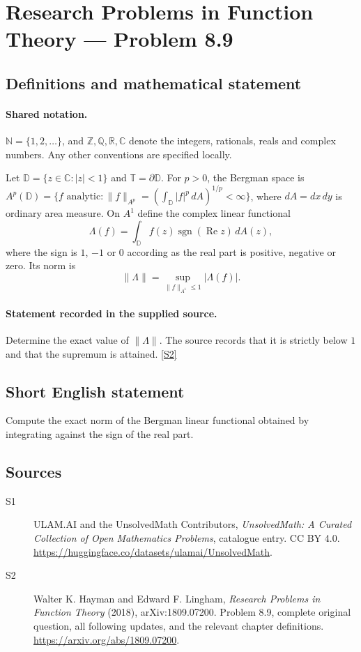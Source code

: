 \documentclass[11pt]{book}
\newcommand{\sref}[2]{\hyperlink{source:#1:#2}{[S#2]}}
\begin{document}
\section{Research Problems in Function Theory — Problem 8.9}\label{statement}

\subsection{Definitions and mathematical statement}

\paragraph{Shared notation.}$\mathbb N=\{1,2,\ldots\}$, and $\mathbb Z,\mathbb Q,\mathbb R,\mathbb C$ denote the integers, rationals, reals and complex numbers. Any other conventions are specified locally.


Let $\mathbb D=\{z\in\mathbb C:|z|<1\}$ and $\mathbb T=\partial\mathbb D$. For $p>0$, the Bergman space is $A^p(\mathbb D)=\{f\text{ analytic}:\|f\|_{A^p}=(\int_{\mathbb D}|f|^p\,dA)^{1/p}<\infty\}$, where $dA=dx\,dy$ is ordinary area measure. On $A^1$ define the complex linear functional \[\Lambda(f)=\int_{\mathbb D}f(z)\operatorname{sgn}(\operatorname{Re}z)\,dA(z),\] where the sign is $1$, $-1$ or $0$ according as the real part is positive, negative or zero. Its norm is \[\|\Lambda\|=\sup_{\|f\|_{A^1}\le1}|\Lambda(f)|.\]
\paragraph{Statement recorded in the supplied source.}
Determine the exact value of $\|\Lambda\|$. The source records that it is strictly below $1$ and that the supremum is attained. \sref{statement}{2}
\subsection{Short English statement}
Compute the exact norm of the Bergman linear functional obtained by integrating against the sign of the real part.
\subsection{Sources}
\begin{description}
\item[\hypertarget{source:statement:1}{S1}] ULAM.AI and the UnsolvedMath Contributors, \emph{UnsolvedMath: A Curated Collection of Open Mathematics Problems}, catalogue entry. CC BY 4.0. \url{https://huggingface.co/datasets/ulamai/UnsolvedMath}.
\item[\hypertarget{source:statement:2}{S2}] Walter K. Hayman and Edward F. Lingham, \emph{Research Problems in Function Theory} (2018), arXiv:1809.07200. Problem 8.9, complete original question, all following updates, and the relevant chapter definitions. \url{https://arxiv.org/abs/1809.07200}.
\end{description}
\label{end:statement}
\end{document}
